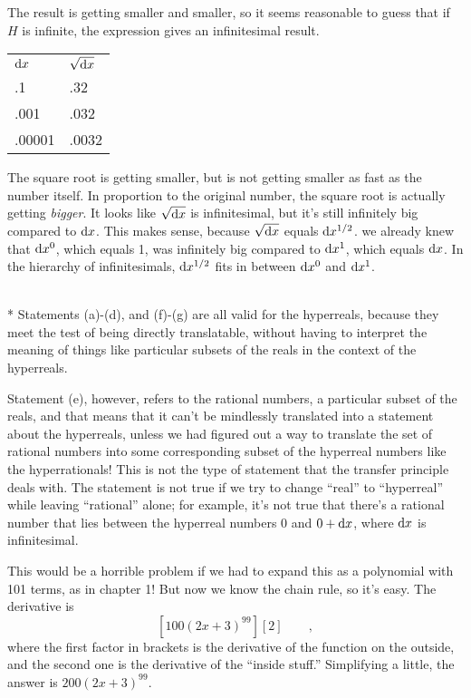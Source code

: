 The result is getting smaller and smaller, so it seems reasonable to guess that if $H$ is infinite,
the expression gives an infinitesimal result.


\begin{tabular}{ll}
$\textup{d} x$ & $\sqrt{\textup{d} x}$ \\
.1 & .32 \\
.001 & .032 \\
.00001 & .0032
\end{tabular}

The square root is getting smaller, but is not getting smaller as fast as the number itself.
In proportion to the original number, the square root is actually getting \emph{bigger}. It
looks like $\sqrt{\textup{d} x}$ is infinitesimal, but it's still infinitely big compared to
$\textup{d} x$. This makes sense, because $\sqrt{\textup{d} x}$ equals $\textup{d} x^{1/2}$.
we already knew that $\textup{d} x^0$, which equals 1, was
infinitely big compared to $\textup{d} x^1$, which equals $\textup{d} x$.
In the hierarchy of infinitesimals, $\textup{d} x^{1/2}$ fits in between $\textup{d} x^0$
and  $\textup{d} x^1$.

\\*
Statements (a)-(d), and (f)-(g) are all valid for the hyperreals, because they meet the test of being
directly translatable, without having to interpret the meaning of things like particular
subsets of the reals in the context of the hyperreals.

Statement (e), however, refers to the
rational numbers, a particular subset of the reals, and that means that it can't be
mindlessly translated into a statement about the hyperreals, unless we had figured out
a way to translate the set of rational numbers into some corresponding subset of the
hyperreal numbers like the hyperrationals! This is not the type of statement that the
transfer principle deals with. The statement is not true if we try to change ``real''
to ``hyperreal'' while leaving ``rational'' alone; for example, it's not true that there's
a rational number that lies between the hyperreal numbers 0 and $0+\textup{d} x$, where $\textup{d} x$
is infinitesimal.

This would be a horrible problem if we had to expand this as a polynomial with 101 terms,
as in chapter 1! But now we know the chain rule, so it's easy. The derivative is
\begin{equation*}
  \left[100(2x+3)^{99}\right][2] \qquad ,
\end{equation*}
where the first factor in brackets is the derivative of the function on the outside, and
the second one is the derivative of the ``inside stuff.'' Simplifying a little, the
answer is $200(2x+3)^{99}$.


